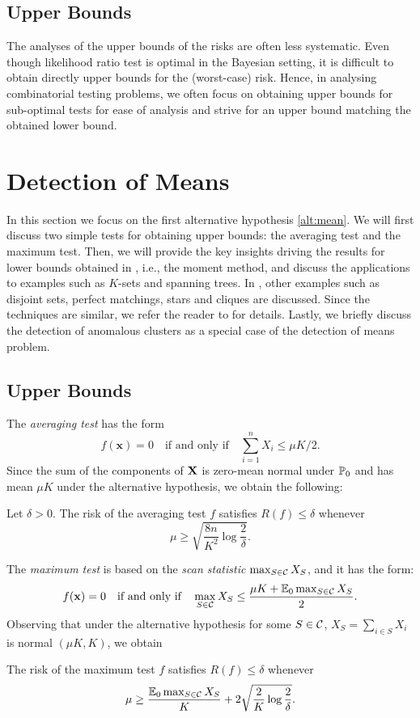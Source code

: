 \documentclass[10pt, oneside]{article}
\begin{document}
\subsection{Upper Bounds}
The analyses of the upper bounds of the risks are often less systematic. Even though likelihood ratio test is optimal in the
Bayesian setting, it is difficult to obtain directly upper bounds for the (worst-case) risk. Hence, in analysing combinatorial testing problems, we often focus on obtaining upper bounds for sub-optimal tests for ease of analysis and strive for an upper bound matching the obtained lower bound.

\section{Detection of Means}
In this section we focus on the first alternative hypothesis \ref{alt:mean}. We will first discuss two simple tests for obtaining upper bounds: the averaging test and the maximum test. Then, we will provide the key insights driving the results for lower bounds obtained in \cite{addario2010combinatorial}, i.e., the moment method, and discuss the applications to examples such as $K$-sets and spanning trees. In \cite{addario2010combinatorial}, other examples such as disjoint sets, perfect matchings, stars and cliques are discussed. Since the techniques are similar, we refer the reader to \cite{addario2010combinatorial} for details. Lastly, we briefly discuss the detection of anomalous clusters as a special case of the detection of means problem.


\subsection{Upper Bounds}
The \textit{averaging test} has the form
\[
f(\mathbf{x}) = 0  \quad\mbox{if and only if}\quad { \sum_{i=1}^n X_i \le \mu K/2 }.
\]
Since the sum of the components of $\mathbf{X}$ is zero-mean normal under $\mathbb{P}_0$
and has mean $\mu K$ under the alternative hypothesis, we obtain the following:
\begin{prop}
  \label{average}
  Let $\delta>0$. The risk of the averaging test $f$ satisfies
  $R(f) \le\delta$
  whenever
  \[
  \mu\ge\sqrt{\frac{8n}{K^2} \log\frac{2}{\delta}}.
  \]
\end{prop}

The \textit{maximum test} is based on the \textit{scan statistic} $\max_{S\in{\mathcal C}} X_S$, and it has the form:
%
\[
f(\mathbf{x}) = 0 \quad\mbox{if and only if}\quad
\max_{S\in{\mathcal C}} X_S\le\frac{\mu K + \mathbb{E}_0 \max_{S\in{\mathcal C}} X_S}{2}.
\]
Observing that under the alternative hypothesis for some $S\in{\mathcal C}$, $X_S= \sum_{i\in S} X_i$ is normal
$(\mu K, K)$, we obtain
\begin{prop}
  \label{maxtest}
  The risk of the maximum test $f$ satisfies
  $R(f) \le\delta$ whenever
  \[
  \mu\ge\frac{\mathbb{E}_0 \max_{S\in{\mathcal C}} X_S}{K} + 2\sqrt{\frac{2}{K}
  \log
  \frac{2}{\delta}}.
  \]
\end{prop}
\end{document}
